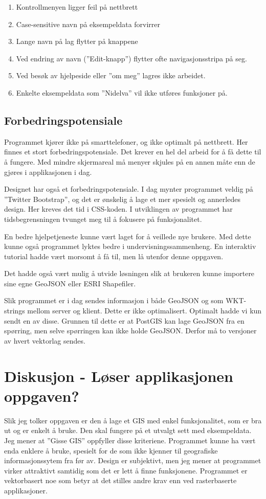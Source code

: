 \documentclass[12pt,twoside,onecolumn]{article}
\begin{document}
	\begin{enumerate}
		\item Kontrollmenyen ligger feil på nettbrett
		\item Case-sensitive navn på eksempeldata forvirrer
		\item Lange navn på lag flytter på knappene
		\item Ved endring av navn (''Edit-knapp'') flytter ofte navigasjonsstripa på seg.
		\item Ved besøk av hjelpeside eller ''om meg'' lagres ikke arbeidet.
		\item Enkelte eksempeldata som ''Nidelva'' vil ikke utføres funksjoner på.
		
	\end{enumerate}
	
	
	\subsection{Forbedringspotensiale}
	
	Programmet kjører ikke på smarttelefoner, og ikke optimalt på nettbrett. Her finnes et stort forbedringspotensiale. Det krever en hel del arbeid for å få dette til å fungere. Med mindre skjermareal må menyer skjules på en annen måte enn de gjøres i applikasjonen i dag.
	
	Designet har også et forbedringspotensiale. I dag mynter programmet veldig på ''Twitter Bootstrap'', og det er ønskelig å lage et mer spesielt og annerledes design. Her kreves det tid i CSS-koden. I utviklingen av programmet har tidsbegrensningen tvunget meg til å fokusere på funksjonalitet.
	
	En bedre hjelpetjeneste kunne vært laget for å veillede nye brukere. Med dette kunne også programmet lyktes bedre i undervisningssammenheng. En interaktiv tutorial hadde vært morsomt å få til, men lå utenfor denne oppgaven. 
	
	Det hadde også vært mulig å utvide løsningen slik at brukeren kunne importere sine egne GeoJSON eller ESRI Shapefiler.
	
	Slik programmet er i dag sendes informasjon i både GeoJSON og som WKT-strings mellom server og klient. Dette er ikke optimalisert. Optimalt hadde vi kun sendt en av disse. Grunnen til dette er at PostGIS kan lage GeoJSON fra en spørring, men selve spørringen kan ikke holde GeoJSON. Derfor må to versjoner av hvert vektorlag sendes. 
	
\section{Diskusjon - Løser applikasjonen oppgaven?}
	Slik jeg tolker oppgaven er den å lage et GIS med enkel funksjonalitet, som er bra ut og er enkelt å bruke. Den skal fungere på et utvalgt sett med eksempeldata. Jeg mener at ''Gisse GIS'' oppfyller disse kriteriene. Programmet kunne ha vært enda enklere å bruke, spesielt for de som ikke kjenner til geografiske informasjonssytem fra før av. Design er subjektivt, men jeg mener at programmet virker attraktivt samtidig som det er lett å finne funksjonene. Programmet er vektorbasert noe som betyr at det stilles andre krav enn ved rasterbaserte applikasjoner.
	
\end{document}
